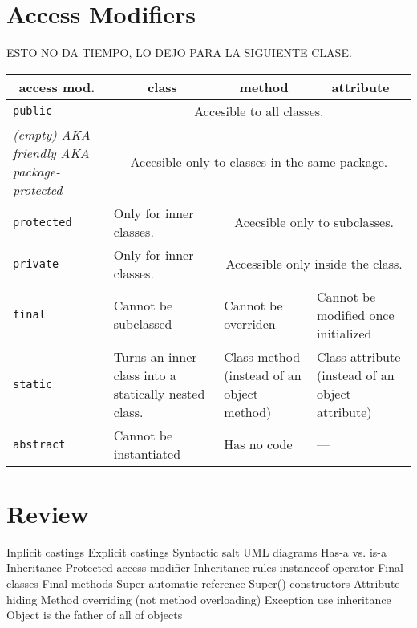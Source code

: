 \documentclass[a4paper, 9pt]{extarticle}
\begin{document}
\newpage

\section{Access Modifiers}

ESTO NO DA TIEMPO, LO DEJO PARA LA SIGUIENTE CLASE.

\begin{center}
  \begin{tabular}{|p{3cm}|p{4cm}|p{4cm}|p{4cm}|}
\hline
\multicolumn{1}{|c|}{access mod.} & \multicolumn{1}{|c|}{class} & \multicolumn{1}{|c|}{method} & \multicolumn{1}{|c|}{attribute} \\
\hline
\texttt{public}    & \multicolumn{3}{|c|}{Accesible to all classes.} \\
\hline
\textsl{(empty) AKA friendly AKA package-protected} & \multicolumn{3}{|c|}{Accesible only to classes in the same package.} \\
\hline
\texttt{protected}   & Only for inner classes. & \multicolumn{2}{|c|}{Acecsible only to subclasses.} \\
\hline
\texttt{private}     & Only for inner classes. & \multicolumn{2}{|c|}{Accessible only inside the class.} \\
\hline
\hline
\texttt{final}       & Cannot be subclassed & Cannot be overriden & Cannot be modified once initialized \\
\hline
\texttt{static}      & Turns an inner class into a statically nested class. & Class method (instead of an object method) & Class attribute (instead of an object attribute) \\
\hline
\texttt{abstract}    & Cannot be instantiated & Has no code & --- \\
\hline
\end{tabular}
\end{center}








\section{Review}

\begin{blackboard}
Inplicit castings
Explicit castings
Syntactic salt
UML diagrams
Has-a vs. is-a
Inheritance
Protected access modifier
Inheritance rules
instanceof operator
Final classes
Final methods
Super automatic reference
Super() constructors
Attribute hiding
Method overriding (not method overloading)
Exception use inheritance
Object is the father of all of objects
\end{blackboard}
\end{document}
